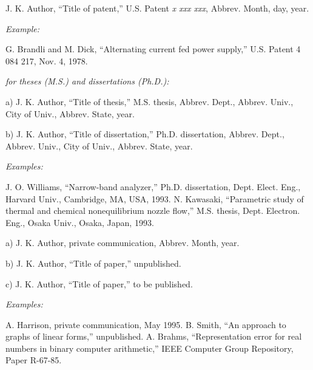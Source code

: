 \documentclass[journal,twoside,web]{ieeecolor}
\begin{document}
\noindent J. K. Author, ``Title of patent,'' U.S. Patent {\it x xxx xxx}, Abbrev. Month, day, year.

{\it Example:}{\vadjust{\vspace*{-2.5em}}}

\begin{thebibliography}{00}
 G. Brandli and M. Dick, ``Alternating current fed power supply,'' U.S. Patent 4 084 217, Nov. 4, 1978.
\end{thebibliography}

 {\it for theses (M.S.) and dissertations (Ph.D.):}

\noindent a) J. K. Author, ``Title of thesis,'' M.S. thesis, Abbrev. Dept., Abbrev.
Univ., City of Univ., Abbrev. State, year.

\noindent b) J. K. Author, ``Title of dissertation,'' Ph.D. dissertation, Abbrev.
Dept., Abbrev. Univ., City of Univ., Abbrev. State, year.

{\it Examples:}{\vadjust{\vspace*{-2.5em}}}

\begin{thebibliography}{00}
 J. O. Williams, ``Narrow-band analyzer,'' Ph.D. dissertation, Dept. Elect. Eng., Harvard Univ., Cambridge, MA, USA, 1993.
 N. Kawasaki, ``Parametric study of thermal and chemical nonequilibrium nozzle flow,'' M.S. thesis, Dept. Electron. Eng., Osaka Univ., Osaka, Japan, 1993.
\end{thebibliography}


\noindent a) J. K. Author, private communication, Abbrev. Month, year.

\noindent b) J. K. Author, ``Title of paper,'' unpublished.

\noindent c) J. K. Author, ``Title of paper,'' to be published.

{\it Examples:}{\vadjust{\vspace*{-2.5em}}}

\begin{thebibliography}{00}
 A. Harrison, private communication, May 1995.
 B. Smith, ``An approach to graphs of linear forms,'' unpublished.
 A. Brahms, ``Representation error for real numbers in binary computer arithmetic,'' IEEE Computer Group Repository, Paper R-67-85.
\end{thebibliography}
\end{document}
